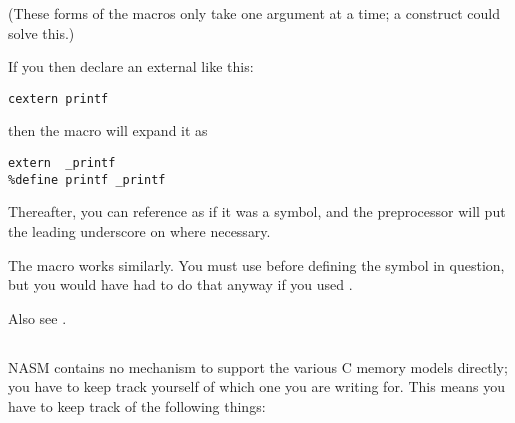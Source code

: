 (These forms of the macros only take one argument at a time; a
 construct could solve this.)

If you then declare an external like this:

\begin{lstlisting}
cextern printf
\end{lstlisting}

then the macro will expand it as

\begin{lstlisting}
extern  _printf
%define printf _printf
\end{lstlisting}

Thereafter, you can reference  as if it was a symbol, and
the preprocessor will put the leading underscore on where necessary.

The  macro works similarly. You must use 
before defining the symbol in question, but you would have had to do
that anyway if you used .

Also see .

\subsection{}
\label{subsec:16cmodels}

NASM contains no mechanism to support the various C memory models
directly; you have to keep track yourself of which one you are
writing for. This means you have to keep track of the following
things:


